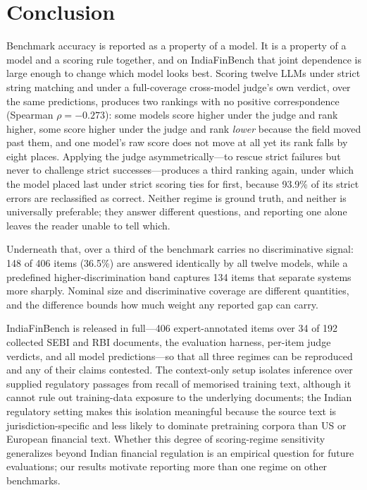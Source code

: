 \section{Conclusion}
\label{sec:conclusion}

Benchmark accuracy is reported as a property of a model. It is a property of a model and a scoring
rule together, and on IndiaFinBench that joint dependence is large enough to change which model looks
best. Scoring twelve LLMs under strict string matching and under a full-coverage cross-model judge's
own verdict, over the same predictions, produces two rankings with no positive correspondence
(Spearman $\rho = -0.273$): some models score higher under the judge and rank higher, some score
higher under the judge and rank \emph{lower} because the field moved past them, and one model's raw
score does not move at all yet its rank falls by eight places. Applying the judge asymmetrically---to
rescue strict failures but never to challenge strict successes---produces a third ranking again,
under which the model placed last under strict scoring ties for first, because 93.9\% of its strict
errors are reclassified as correct. Neither regime is ground truth, and neither is universally
preferable; they answer different questions, and
reporting one alone leaves the reader unable to tell which.

Underneath that, over a third of the benchmark carries no discriminative signal: 148 of 406 items
(36.5\%) are answered identically by all twelve models, while a predefined higher-discrimination
band captures 134 items that separate systems more sharply. Nominal size and discriminative
coverage are different quantities, and the difference bounds how much weight any reported gap can
carry.

IndiaFinBench is released in full---406 expert-annotated items over 34 of 192 collected SEBI and RBI documents,
the evaluation harness, per-item judge verdicts, and all model predictions---so that all three
regimes can be reproduced and any of their claims contested. The context-only setup isolates
inference over supplied regulatory passages from recall of memorised training text, although it
cannot rule out training-data exposure to the underlying documents; the Indian regulatory setting
makes this isolation meaningful because the source text is jurisdiction-specific and less likely to
dominate pretraining corpora than US or European financial text. Whether this degree of
scoring-regime sensitivity generalizes beyond Indian financial regulation is an empirical question
for future evaluations; our results motivate reporting more than one regime on other benchmarks.

